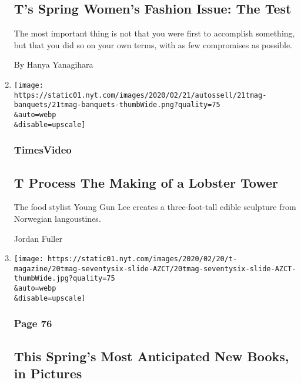 \begin{enumerate}
  \hypertarget{ts-spring-womens-fashion-issue-the-test}{%
  \subsection{T's Spring Women's Fashion Issue: The
  Test}\label{ts-spring-womens-fashion-issue-the-test}}

  The most important thing is not that you were first to accomplish
  something, but that you did so on your own terms, with as few
  compromises as possible.

  By Hanya Yanagihara
\item
  \href{/video/t-magazine/100000006981030/t-process-the-making-of-a-lobster-tower.html}{}

  \texttt{[image: https://static01.nyt.com/images/2020/02/21/autossell/21tmag-banquets/21tmag-banquets-thumbWide.png?quality=75\\\&auto=webp\\\&disable=upscale]}

  \hypertarget{timesvideo-2}{%
  \subsubsection{TimesVideo}\label{timesvideo-2}}

  \hypertarget{t-process--the-making-of-a-lobster-tower}{%
  \subsection{T Process \textbar{} The Making of a Lobster
  Tower}\label{t-process--the-making-of-a-lobster-tower}}

  The food stylist Young Gun Lee creates a three-foot-tall edible
  sculpture from Norwegian langoustines.

  Jordan Fuller
\item
  \href{/2020/02/20/t-magazine/spring-books.html}{}

  \texttt{[image: https://static01.nyt.com/images/2020/02/20/t-magazine/20tmag-seventysix-slide-AZCT/20tmag-seventysix-slide-AZCT-thumbWide.jpg?quality=75\\\&auto=webp\\\&disable=upscale]}

  \hypertarget{page-76}{%
  \subsubsection{Page 76}\label{page-76}}

  \hypertarget{this-springs-most-anticipated-new-books-in-pictures}{%
  \subsection{This Spring's Most Anticipated New Books, in
  Pictures}\label{this-springs-most-anticipated-new-books-in-pictures}}


\end{enumerate}
